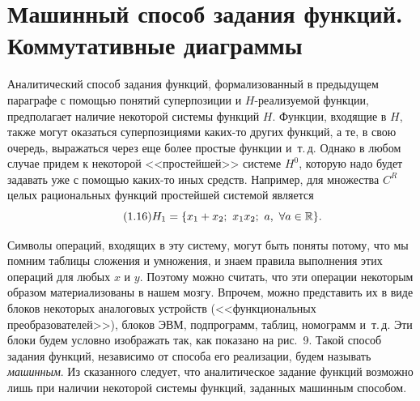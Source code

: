 \section{Машинный способ задания функций. Коммутативные диаграммы}


Аналитический способ задания функций, формализованный в предыдущем
параграфе с помощью понятий суперпозиции и $H$-реализуемой функции,
предполагает наличие некоторой системы функций $H$. Функции, входящие в $H$,
также могут оказаться суперпозициями каких-то других функций, а те, в свою
очередь, выражаться через еще более простые функции и~т.\,д. Однако в любом
случае придем к некоторой <<простейшей>> системе $H^0$, которую надо будет
задавать уже с помощью каких-то иных средств. Например, для множества $C^R$
целых рациональных функций простейшей системой является
\begin{equation}\tag{1.16}
H_1=\{x_1+x_2;\ x_1x_2;\ a,\ \forall a\in\mathbb R\}.
\end{equation}

\begin{figure}[h]
\centering
{}
\end{figure}

Символы операций, входящих в эту систему, могут быть поняты потому, что мы
помним таблицы сложения и умножения, и знаем правила выполнения этих операций
для любых $x$ и $y$. Поэтому можно считать, что эти операции некоторым
образом материализованы в нашем мозгу. Впрочем, можно представить их в виде
блоков некоторых аналоговых устройств (<<функциональных преобразователей>>),
блоков ЭВМ, подпрограмм, таблиц, номограмм и~т.\,д. Эти блоки будем условно
%
изображать так, как показано на рис.~9. Такой способ задания функций,
независимо от способа его реализации, будем называть \emph{машинным}. Из
сказанного следует, что аналитическое задание функций возможно лишь при
наличии некоторой системы функций, заданных машинным способом.

